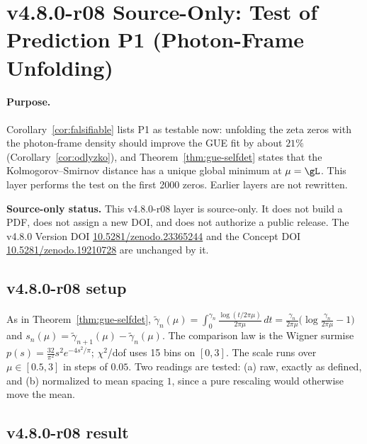 
\clearpage
\section*{v4.8.0-r08 Source-Only: Test of Prediction P1 (Photon-Frame Unfolding)}
\label{sec:v480-r08-p1-test}

\paragraph{Purpose.}
Corollary~\ref{cor:falsifiable} lists P1 as testable now: unfolding the zeta zeros with the
photon-frame density should improve the GUE fit by about \(21\%\) (Corollary~\ref{cor:odlyzko}),
and Theorem~\ref{thm:gue-selfdet} states that the Kolmogorov--Smirnov distance has a unique global
minimum at \(\mu=\gL\).  This layer performs the test on the first 2000 zeros.  Earlier layers are
not rewritten.

\noindent\textbf{Source-only status.}
This v4.8.0-r08 layer is source-only.  It does not build a PDF, does not assign a new DOI,
and does not authorize a public release.  The v4.8.0 Version DOI
\href{https://doi.org/10.5281/zenodo.23365244}{10.5281/zenodo.23365244} and the Concept DOI
\href{https://doi.org/10.5281/zenodo.19210728}{10.5281/zenodo.19210728} are unchanged by it.

\subsection*{v4.8.0-r08 setup}
\label{subsec:v480-r08-setup}

As in Theorem~\ref{thm:gue-selfdet},
\(\tilde\gamma_n(\mu)=\int_0^{\gamma_n}\frac{\log(t/2\pi\mu)}{2\pi\mu}\,dt
=\frac{\gamma_n}{2\pi\mu}\bigl(\log\frac{\gamma_n}{2\pi\mu}-1\bigr)\) and
\(s_n(\mu)=\tilde\gamma_{n+1}(\mu)-\tilde\gamma_n(\mu)\).  The comparison law is the Wigner surmise
\(p(s)=\frac{32}{\pi^2}s^2e^{-4s^2/\pi}\); \(\chi^2\)/dof uses 15 bins on \([0,3]\).  The scale runs over
\(\mu\in[0.5,3]\) in steps of \(0.05\).  Two readings are tested: (a) raw, exactly as defined, and
(b) normalized to mean spacing \(1\), since a pure rescaling would otherwise move the mean.

\subsection*{v4.8.0-r08 result}
\label{subsec:v480-r08-result}

